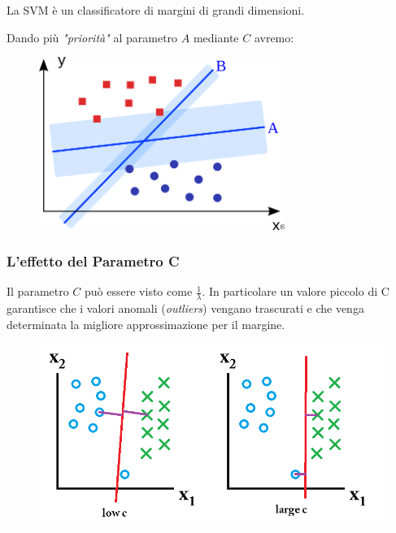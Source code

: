 \begin{definizione}
  La SVM è un classificatore di margini di grandi dimensioni.
\end{definizione}
Dando più \textit{"priorità"} al parametro $A$ mediante $C$ avremo:
\begin{figure}[H]
    \centering
    \includegraphics[width=0.7\textwidth]{img/fig-4-large-margin-decision-boundary.png}s
\end{figure}
\subsubsection{L'effetto del Parametro C}
Il parametro $C$ può essere visto come $\frac{1}{\lambda}$. In particolare un valore piccolo di C garantisce che i valori anomali (\textit{outliers}) vengano trascurati e che venga determinata la migliore approssimazione per il margine. 
\begin{figure}[H]
    \centering
    \includegraphics[width=1\textwidth]{img/fig-5-effect-of-regularization.png}
\end{figure}

